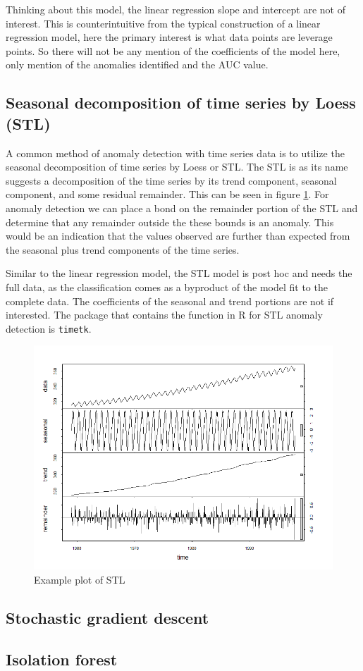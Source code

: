 \documentclass{article}
\begin{document}
Thinking about this model, the linear regression slope and intercept are not of interest. This is counterintuitive from the typical construction of a linear regression model, here the primary interest is what data points are leverage points. So there will not be any mention of the coefficients of the model here, only mention of the anomalies identified and the AUC value.

\subsection{Seasonal decomposition of time series by Loess (STL)}
A common method of anomaly detection with time series data is to utilize the seasonal decomposition of time series by Loess or STL. The STL is as its name suggests a decomposition of the time series by its trend component, seasonal component, and some residual remainder. This can be seen in figure \ref{fig:stl_fig}. For anomaly detection we can place a bond on the remainder portion of the STL and determine that any remainder outside the these bounds is an anomaly. This would be an indication that the values observed are further than expected from the seasonal plus trend components of the time series.

Similar to the linear regression model, the STL model is post hoc and needs the full data, as the classification comes as a byproduct of the model fit to the complete data. The coefficients of the seasonal and trend portions are not if interested. The package that contains the function in R for STL anomaly detection is \texttt{timetk}.

\begin{figure}[ht]
    \centering
    \includegraphics[width=.7\textwidth]{stl_model.png}
    \caption{Example plot of STL}
    \label{fig:stl_fig}
\end{figure}


\subsection{Stochastic gradient descent}



\subsection{Isolation forest}
\end{document}
